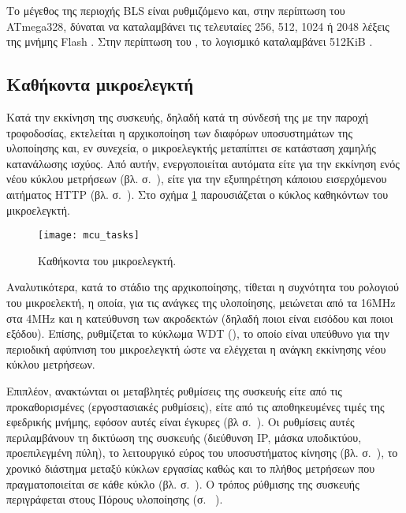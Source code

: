 Το μέγεθος της περιοχής BLS είναι ρυθμιζόμενο και, στην περίπτωση του ATmega328,
δύναται να καταλαμβάνει τις τελευταίες 256, 512, 1024 ή 2048 λέξεις της μνήμης
Flash \parencite[282]{atmel13}. Στην περίπτωση του ,
το λογισμικό  καταλαμβάνει 512KiB \parencite{arduino:uno}.


\subsection{Καθήκοντα μικροελεγκτή}

Κατά την εκκίνηση της συσκευής, δηλαδή κατά τη σύνδεσή της με την παροχή
τροφοδοσίας, εκτελείται η αρχικοποίηση των διαφόρων υποσυστημάτων της υλοποίησης
και, εν συνεχεία, ο μικροελεγκτής μεταπίπτει σε κατάσταση χαμηλής κατανάλωσης
ισχύος. Από αυτήν, ενεργοποιείται αυτόματα είτε για την εκκίνηση ενός νέου
κύκλου μετρήσεων (βλ.  σ.~\pageref{sec:task}), είτε για την
εξυπηρέτηση κάποιου εισερχόμενου αιτήματος HTTP (βλ.  σ.~\pageref{sec:network:impl-resources}). Στο σχήμα
\ref{fig:mcu:tasks} παρουσιάζεται ο κύκλος καθηκόντων του μικροελεγκτή.

\begin{figure}
    \caption{Καθήκοντα του μικροελεγκτή.\label{fig:mcu:tasks}}
    \begin{center}
    \texttt{[image: mcu\_tasks]}
    \end{center}
\end{figure}

Αναλυτικότερα, κατά το στάδιο της αρχικοποίησης, τίθεται η συχνότητα του
ρολογιού του μικροελεκτή, η οποία, για τις ανάγκες της υλοποίησης, μειώνεται από
τα 16MHz στα 4MHz και η κατεύθυνση των ακροδεκτών (δηλαδή ποιοι είναι εισόδου
και ποιοι εξόδου). Επίσης, ρυθμίζεται το κύκλωμα WDT (), το
οποίο είναι υπεύθυνο για την περιοδική αφύπνιση του μικροελεγκτή ώστε να
ελέγχεται η ανάγκη εκκίνησης νέου κύκλου μετρήσεων.

Επιπλέον, ανακτώνται οι μεταβλητές ρυθμίσεις της συσκευής είτε από τις
προκαθορισμένες (εργοστασιακές ρυθμίσεις), είτε από τις αποθηκευμένες τιμές της
εφεδρικής μνήμης, εφόσον αυτές είναι έγκυρες (βλ 
σ.~\pageref{subsec:backup-memory}).
Οι ρυθμίσεις αυτές περιλαμβάνουν τη δικτύωση της συσκευής (διεύθυνση IP, μάσκα
υποδικτύου, προεπιλεγμένη πύλη), το λειτουργικό εύρος του υποσυστήματος κίνησης
(βλ.  σ.~\pageref{sec:motor:coordinates}), το
χρονικό διάστημα μεταξύ κύκλων εργασίας καθώς και το πλήθος μετρήσεων που
πραγματοποιείται σε κάθε κύκλο (βλ.  σ.~\pageref{sec:task}).
Ο τρόπος ρύθμισης της συσκευής περιγράφεται στους Πόρους υλοποίησης (σ.~%
\pageref{sec:network:impl-resources}).

